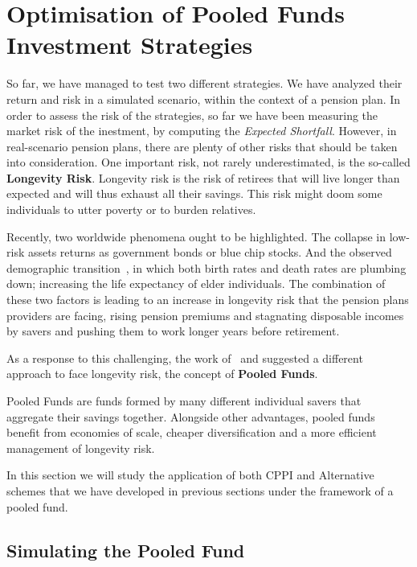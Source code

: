 \section{Optimisation of Pooled Funds Investment Strategies}

So far, we have managed to test two different strategies. We have analyzed their return and risk in a simulated scenario, within the context of a pension plan. In order to assess the risk of the strategies, so far we have been measuring the market risk of the inestment, by computing the \emph{Expected Shortfall}. However, in real-scenario pension plans, there are plenty of other risks that should be taken into consideration. One important risk, not rarely underestimated, is the so-called \textbf{Longevity Risk}. Longevity risk is the risk of retirees that will live longer than expected and will thus exhaust all their savings. This risk might doom some individuals to utter poverty or to burden relatives.

Recently, two worldwide phenomena ought to be highlighted. The collapse in low-risk assets returns as government bonds or blue chip stocks. And the observed demographic transition~\textcite{b:demographic, a:bongaarts-human}, in which both birth rates and death rates are plumbing down; increasing the life expectancy of elder individuals. The combination of these two factors is leading to an increase in longevity risk that the pension plans providers are facing, rising pension premiums and stagnating disposable incomes by savers and pushing them to work longer years before retirement.

As a response to this challenging, the work of~\cite{a:donnelly-transparency} and \cite{a:brautigam-pool} suggested a different approach to face longevity risk, the concept of \textbf{Pooled Funds}.

Pooled Funds are funds formed by many different individual savers that aggregate their savings together. Alongside other advantages, pooled funds benefit from economies of scale, cheaper diversification and a more efficient management of longevity risk.

In this section we will study the application of both CPPI and Alternative schemes that we have developed in previous sections under the framework of a pooled fund.

\subsection{Simulating the Pooled Fund}

